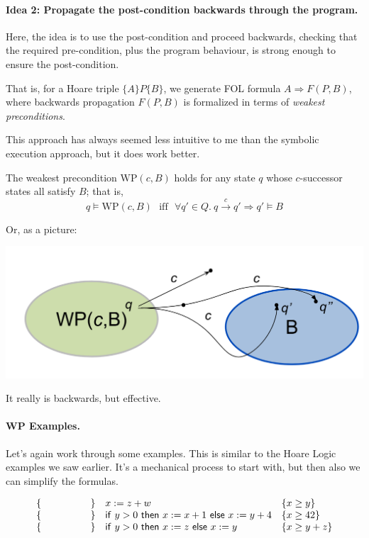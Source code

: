 \documentclass[11pt]{article}
\begin{document}
\paragraph{Idea 2: Propagate the post-condition backwards through the program.} Here, the idea is to use the post-condition
and proceed backwards, checking that the required pre-condition, plus the program behaviour, is strong enough to ensure
the post-condition.

That is, for a Hoare triple
$\{ A \} P \{ B \}$, we generate FOL formula $A \Rightarrow F(P, B)$, where backwards propagation $F(P, B)$ is formalized
in terms of \emph{weakest preconditions}.

This approach has always seemed less intuitive to me than the symbolic execution approach, but it does work better.

The weakest precondition $\mathrm{WP}(c, B)$ holds for any state $q$ whose $c$-successor states
all satisfy $B$; that is,
\[
q \models \mathrm{WP}(c, B) \mathrm{~~~iff~~~} \forall q' \in Q. ~q \xrightarrow{c} q' \Rightarrow q' \models B
\]

Or, as a picture:
\begin{center}
  \includegraphics[width=.6\textwidth]{L17/wp.png}
\end{center}
It really is backwards, but effective.

\paragraph{WP Examples.} Let's again work through some examples. This is similar to the Hoare Logic examples we saw earlier. It's a mechanical process
to start with, but then also we can simplify the formulas.

\[
\begin{array}{lll}
  \{ \hspace*{5em} \} & x := z + w &\{ x \geq y \} \\
  \{ \hspace*{5em} \} & \mathsf{if~}y > 0\mathsf{~then~} x := x + 1 \mathsf{~else~} x := y + 4 &\{x \geq 42 \} \\
  \{ \hspace*{5em} \} & \mathsf{if~}y > 0\mathsf{~then~} x := z \mathsf{~else~} x := y &\{ x \geq y + z \} \\
\end{array}
\]
\end{document}
